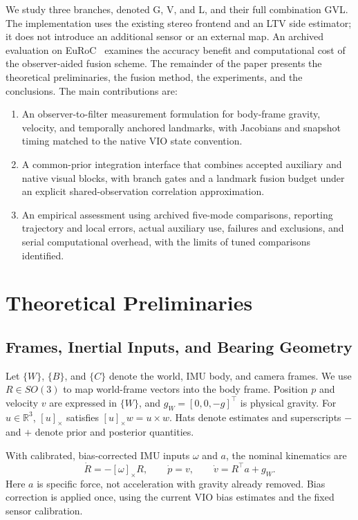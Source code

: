 \documentclass[a4paper,runningheads,twocolumn]{llncs}
\newcommand{\R}{\mathbb{R}}
\newcommand{\sk}[1]{[#1]_{\times}}
\begin{document}
We study three branches, denoted G, V, and L, and their full combination GVL. The implementation uses the existing stereo frontend and an LTV side estimator; it does not introduce an additional sensor or an external map. An archived evaluation on EuRoC~\cite{burri2016} examines the accuracy benefit and computational cost of the observer-aided fusion scheme. The remainder of the paper presents the theoretical preliminaries, the fusion method, the experiments, and the conclusions. The main contributions are:
\begin{enumerate}
\item An observer-to-filter measurement formulation for body-frame gravity, velocity, and temporally anchored landmarks, with Jacobians and snapshot timing matched to the native VIO state convention.
\item A common-prior integration interface that combines accepted auxiliary and native visual blocks, with branch gates and a landmark fusion budget under an explicit shared-observation correlation approximation.
\item An empirical assessment using archived five-mode comparisons, reporting trajectory and local errors, actual auxiliary use, failures and exclusions, and serial computational overhead, with the limits of tuned comparisons identified.
\end{enumerate}

\section{Theoretical Preliminaries}
\subsection{Frames, Inertial Inputs, and Bearing Geometry}
Let $\{W\}$, $\{B\}$, and $\{C\}$ denote the world, IMU body, and camera frames. We use $R\in SO(3)$ to map world-frame vectors into the body frame. Position $p$ and velocity $v$ are expressed in $\{W\}$, and $g_W=[0,0,-g]^\top$ is physical gravity. For $u\in\R^3$, $\sk{u}$ satisfies $\sk{u}w=u\times w$. Hats denote estimates and superscripts $-$ and $+$ denote prior and posterior quantities.

With calibrated, bias-corrected IMU inputs $\omega$ and $a$, the nominal kinematics are
\begin{equation}
 \dot R=-\sk{\omega}R,\qquad
 \dot p=v,\qquad
 \dot v=R^\top a+g_W .
 \label{eq:kinematics}
\end{equation}
Here $a$ is specific force, not acceleration with gravity already removed. Bias correction is applied once, using the current VIO bias estimates and the fixed sensor calibration.
\end{document}
